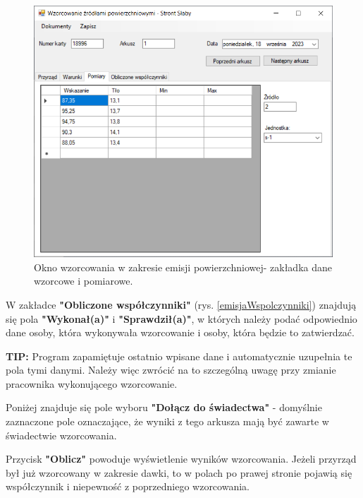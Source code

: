 	\begin{figure}[htb]
		\centering
		\includegraphics[width=\columnwidth]{obrazki/Wzorcowanie/emisja/dane.png}
		\caption{Okno wzorcowania w zakresie emisji powierzchniowej- zakładka dane wzorcowe i pomiarowe.}
		\label{emisjaDane}
	\end{figure}
	
	W zakładce \textbf{"Obliczone współczynniki"} (rys. \ref{emisjaWspolczynniki}) znajdują się pola \textbf{"Wykonał(a)"} i \textbf{"Sprawdził(a)"}, w których należy podać odpowiednio dane osoby, która wykonywała wzorcowanie i osoby, która będzie to zatwierdzać. 
	
	\textbf{TIP:} Program zapamiętuje ostatnio wpisane dane i automatycznie uzupełnia te pola tymi danymi. Należy więc zwrócić na to szczególną uwagę przy zmianie pracownika wykonującego wzorcowanie.
	
	Poniżej znajduje się pole wyboru \textbf{"Dołącz do świadectwa"} - domyślnie zaznaczone pole oznaczające, że wyniki z tego arkusza mają być zawarte w świadectwie wzorcowania.
	
	Przycisk \textbf{"Oblicz"} powoduje wyświetlenie wyników wzorcowania. Jeżeli przyrząd był już wzorcowany w zakresie dawki, to w polach po prawej stronie pojawią się współczynnik i niepewność z poprzedniego wzorcowania. 
	
